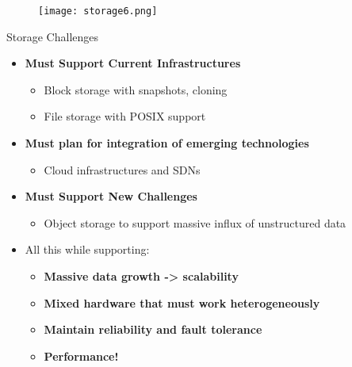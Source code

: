 \begin{frame}{}
    \begin{figure}[htpb]
        \centering
        \texttt{[image: storage6.png]}
    \end{figure}
\end{frame}

\begin{frame}{Storage Challenges}
    \begin{itemize}
        \item \textbf{Must Support Current Infrastructures}
            \begin{itemize}
                \item Block storage with snapshots, cloning
                \item File storage with POSIX support
            \end{itemize}
        \item \textbf{Must plan for integration of emerging technologies}
            \begin{itemize}
                \item Cloud infrastructures and SDNs
            \end{itemize}
        \item \textbf{Must Support New Challenges}
            \begin{itemize}
                \item Object storage to support massive influx of unstructured data
            \end{itemize}
        \item All this while supporting:
            \begin{itemize}
                \item \textbf{Massive data growth -> scalability}
                \item \textbf{Mixed hardware that must work heterogeneously}
                \item \textbf{Maintain reliability and fault tolerance}
                \item \textbf{Performance!} 
            \end{itemize}
    \end{itemize}
\end{frame}

